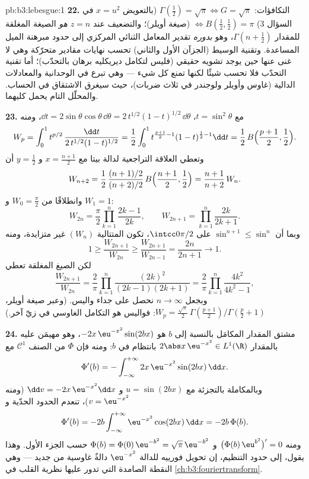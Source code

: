\begin{solution}{pb:b3:lebesgue:1}
\textbf{22.} التكافؤات: $\Gamma(\frac12) = \sqrt\pi
\Leftrightarrow G = \sqrt\pi$ (بالتعويض $x = u^2$ في السؤال
3) $\Leftrightarrow B(\frac12, \frac12) = \pi$ (صيغة أويلر)؛ والتضعيف عند $z = n$ \emph{هو} الصيغة
المغلقة للمقدار $\Gamma(n + \frac12)$، وهو \emph{بدوره} تقدير المعامل الثنائي
المركزي إلى حدود مبرهنة الميل المساعدة. وتقنية الوسيط (الجزآن
الأول والثاني) تحسب نهايات مقادير متحرّكة وهي لا غنى عنها حين
يوجد تشويه حقيقي (فليس لتكامل ديريكليه برهان بالتحدّب)؛ أما
تقنية التحدّب فلا تحسب شيئًا لكنها تمنع كل شيء --- وهي تبرع في
الوحدانية والمعادلات الدالية (غاوس وأويلر ولوجندر في ثلاث
ضربات)، حيث سيغرق الاشتقاق في الحساب. والمحلّل التام يحمل
كليهما.

\textbf{23.} مع $t = \sin^2\theta$، $\dd t =
2\sin\theta\cos\theta\,\dd\theta =
2\,t^{1/2}(1-t)^{1/2}\,\dd\theta$، ومنه
\[
W_p = \int_0^1 t^{p/2}\,
\frac{\dd t}{2\,t^{1/2}(1-t)^{1/2}}
= \frac12\int_0^1 t^{\frac{p+1}2 - 1}(1-t)^{\frac12 - 1}\dd t
= \frac12\,B\Bigl(\frac{p+1}2, \frac12\Bigr).
\]
وتعطي العلاقة التراجعية لدالة بيتا مع $x = \frac{n+1}2$ و $y = \frac12$
أن
\[
W_{n+2} = \frac12\,
\frac{(n+1)/2}{(n+2)/2}\,B\Bigl(\frac{n+1}2, \frac12\Bigr)
= \frac{n+1}{n+2}\,W_n .
\]
وانطلاقًا من $W_0 = \frac\pi2$ و $W_1 = 1$:
\[
W_{2n} = \frac\pi2\prod_{k=1}^n\frac{2k-1}{2k},
\qquad
W_{2n+1} = \prod_{k=1}^n\frac{2k}{2k+1} .
\]
وبما أن $\sin^{n+1} \leq \sin^n$ على $\intcc0{\pi/2}$، تكون المتتالية $(W_n)$
غير متزايدة، ومنه
\[
1 \geq \frac{W_{2n+1}}{W_{2n}} \geq
\frac{W_{2n+1}}{W_{2n-1}} = \frac{2n}{2n+1}
\longrightarrow 1 .
\]
لكن الصيغ المغلقة تعطي
\[
\frac{W_{2n+1}}{W_{2n}} = \frac2\pi
\prod_{k=1}^n\frac{(2k)^2}{(2k-1)(2k+1)}
= \frac2\pi\prod_{k=1}^n\frac{4k^2}{4k^2-1},
\]
وبجعل $n \to \infty$ نحصل على جداء واليس. (وعبر صيغة أويلر،
$W_p = \frac{\sqrt\pi}2\,
\Gamma(\frac{p+1}2)/\Gamma(\frac p2 + 1)$: فواليس هو التكامل الغاوسي في زيّ آخر.)

\textbf{24.} مشتق المقدار المكامَل بالنسبة إلى $b$ هو $-2x\,\eu^{-x^2}\sin(2bx)$،
وهو مهيمَن عليه بالمقدار $2\abs
x\,\eu^{-x^2} \in L^1(\R)$ بانتظام في $b$: ومنه فإن
$\Phi$ من الصنف $\mathcal C^1$ مع
\[
\Phi'(b) = -\int_{-\infty}^{+\infty}
2x\,\eu^{-x^2}\sin(2bx)\,\dd x .
\]
وبالمكاملة بالتجزئة مع $u = \sin(2bx)$ و $\dd v =
-2x\,\eu^{-x^2}\dd x$ (ومنه
$v = \eu^{-x^2}$)، تنعدم الحدود الحدّية و
\[
\Phi'(b) = -2b\int_{-\infty}^{+\infty}
\eu^{-x^2}\cos(2bx)\,\dd x = -2b\,\Phi(b).
\]
ومنه $\bigl(\Phi(b)\,\eu^{b^2}\bigr)' = 0$ و $\Phi(b) =
\Phi(0)\,\eu^{-b^2} = \sqrt\pi\,\eu^{-b^2}$ حسب الجزء الأول. وهذا يقول، إلى حدود
التنظيم، إن تحويل فورييه للدالة $\eu^{-x^2}$ دالةٌ غاوسية من
جديد --- وهي النقطة الصامدة التي تدور عليها نظرية القلب في
\cref{ch:b3:fouriertransform}.


\end{solution}
